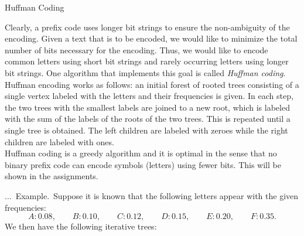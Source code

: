\documentclass[smaller,hyperref={CJKbookmarks=true}]{beamer}
\newcounter{zhuo}[subsection]
\renewcommand{\thezhuo}{\thesection.\thesubsection.\arabic{zhuo}}
\newenvironment{EXAMPLE}{\stepcounter{zhuo}\alert{\!\thezhuo.~Example.\,}}{}
\begin{document}
\begin{frame}{Huffman Coding}
\begin{spacing}{1.05}
Clearly, a prefix code uses longer bit strings to ensure the non-ambiguity of
the encoding. Given a text that is to be encoded, we would like to
minimize the total number of bits necessary for the encoding. Thus, we
would like to encode common letters using short bit strings and rarely
occurring letters using longer bit strings. One algorithm that implements
this goal is called \emph{Huffman coding}.\\[6pt]
Huffman encoding works as follows: an initial forest of rooted trees
consisting of a single vertex labeled with the letters and their frequencies is
given. In each step, the two trees with the smallest labels are joined to a
new root, which is labeled with the sum of the labels of the roots of the
two trees. This is repeated until a single tree is obtained. The left children
are labeled with zeroes while the right children are labeled with ones.\\[6pt]
Huffman coding is a greedy algorithm and it is optimal in the sense that
no binary prefix code can encode symbols (letters) using fewer bits. This
will be shown in the assignments.
\end{spacing}
\newpage
\begin{spacing}{0.75}
\begin{EXAMPLE}
Suppose it is known that the following letters appear
with the given frequencies:
\[A:0.08,\qquad B:0.10,\qquad C:0.12,\qquad D:0.15,\qquad E:0.20,\qquad F:0.35.\]
We then have the following iterative trees:
\begin{center}
\vspace*{-6pt}
\vspace*{-6pt}

\end{center}
\end{EXAMPLE}
\end{spacing}
\end{frame}
\end{document}

